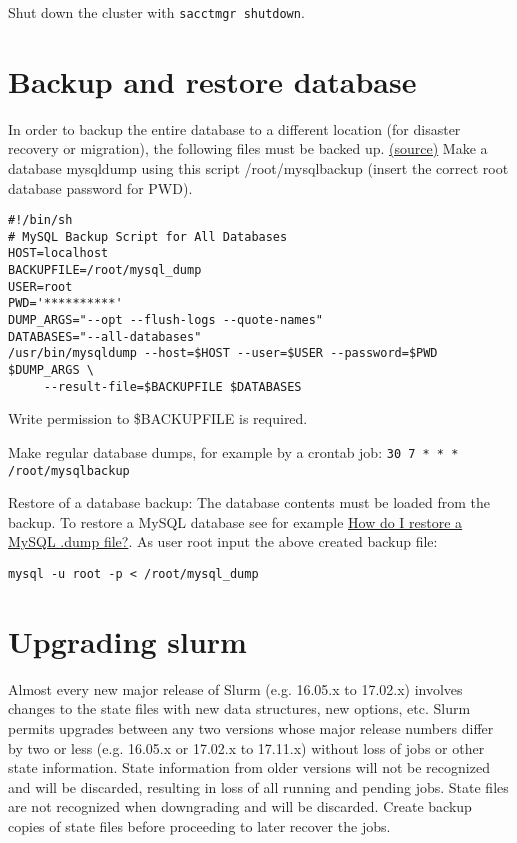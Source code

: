 Shut down the cluster with \texttt{sacctmgr shutdown}. 

\section{Backup and restore database} \label{sec:slurmDBbackup}

In order to backup the entire database to a different location (for disaster recovery or migration), the following files must be backed up. \href{https://wiki.fysik.dtu.dk/niflheim/Slurm_database#backup-and-restore-of-database}{(source)} Make a database mysqldump using this script /root/mysqlbackup (insert the correct root database password for PWD). 

\begin{verbatim}
#!/bin/sh
# MySQL Backup Script for All Databases
HOST=localhost
BACKUPFILE=/root/mysql_dump
USER=root
PWD='**********'
DUMP_ARGS="--opt --flush-logs --quote-names"
DATABASES="--all-databases"
/usr/bin/mysqldump --host=$HOST --user=$USER --password=$PWD $DUMP_ARGS \
     --result-file=$BACKUPFILE $DATABASES
\end{verbatim}

Write permission to \$BACKUPFILE is required.

Make regular database dumps, for example by a crontab job:
\texttt{30 7 * * * /root/mysqlbackup}

Restore of a database backup: The database contents must be loaded from the backup. To restore a MySQL database see for example \href{http://stackoverflow.com/questions/105776/how-do-i-restore-a-mysql-dump-file}{How do I restore a MySQL .dump file?}. As user root input the above created backup file:

\texttt{mysql -u root -p < /root/mysql\_dump}

\section{Upgrading slurm} \label{sec:slurmupgrade}

Almost every new major release of Slurm (e.g. 16.05.x to 17.02.x) involves changes to the state files with new data structures, new options, etc. Slurm permits upgrades between any two versions whose major release numbers differ by two or less (e.g. 16.05.x or 17.02.x to 17.11.x) without loss of jobs or other state information. State information from older versions will not be recognized and will be discarded, resulting in loss of all running and pending jobs. State files are not recognized when downgrading and will be discarded. Create backup copies of state files before proceeding to later recover the jobs.

